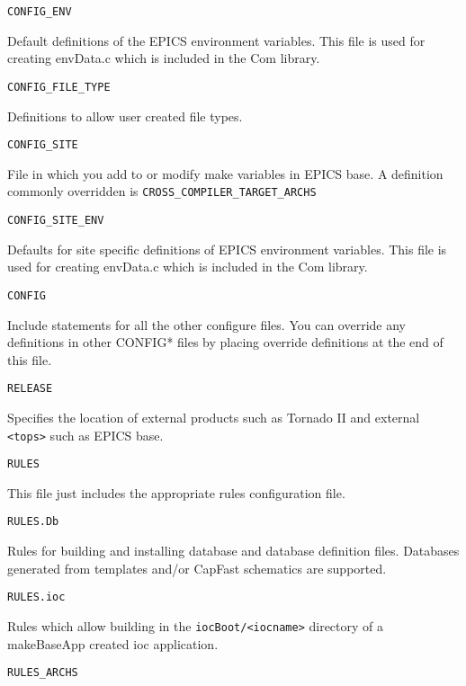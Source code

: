 \begin{description}
\item {}\verb|CONFIG_ENV|

Default definitions of the EPICS environment variables. This file is used for creating envData.c which is included 
in the Com library.

\item {}\verb|CONFIG_FILE_TYPE|

Definitions to allow user created file types.

\item {}\verb|CONFIG_SITE|

File in which you add to or modify make variables in EPICS base. A definition commonly overridden is \verb|CROSS_COMPILER_TARGET_ARCHS|

\item {}\verb|CONFIG_SITE_ENV|

Defaults for site specific definitions of EPICS environment variables. This file is used for creating envData.c 
which is included in the Com library.

\item {}\verb|CONFIG|

Include statements for all the other configure files. You can override any definitions in other CONFIG* files by 
placing override definitions at the end of this file.

\item {}\verb|RELEASE|

Specifies the location of external products such as Tornado II and external \verb|<tops>| such as EPICS base. 

\item {}\verb|RULES|

This file just includes the appropriate rules configuration file.

\item {}\verb|RULES.Db|

Rules for building and installing database and database definition files. Databases generated from templates and/or 
CapFast schematics are supported.

\item {}\verb|RULES.ioc|

Rules which allow building in the \verb|iocBoot/<iocname>| directory of a makeBaseApp created ioc application.

\item {}\verb|RULES_ARCHS|


\end{description}
